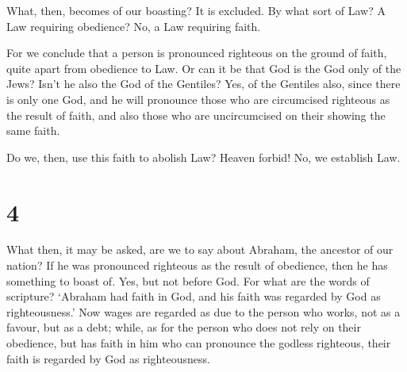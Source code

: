  What, then, becomes of our boasting? It is excluded. By
what sort of Law? A Law requiring obedience? No, a Law requiring faith.

 For we conclude that a person is pronounced righteous on
the ground of faith, quite apart from obedience to Law.  Or
can it be that God is the God only of the Jews? Isn't he also the God of
the Gentiles?  Yes, of the Gentiles also, since there is
only one God, and he will pronounce those who are circumcised righteous
as the result of faith, and also those who are uncircumcised on their
showing the same faith.

 Do we, then, use this faith to abolish Law? Heaven forbid!
No, we establish Law.

\hypertarget{section-3}{%
\section{4}\label{section-3}}

 What then, it may be asked, are we to say about Abraham,
the ancestor of our nation?  If he was pronounced righteous
as the result of obedience, then he has something to boast of. Yes, but
not before God.  For what are the words of scripture?
`Abraham had faith in God, and his faith was regarded by God as
righteousness.'  Now wages are regarded as due to the person
who works, not as a favour, but as a debt;  while, as for
the person who does not rely on their obedience, but has faith in him
who can pronounce the godless righteous, their faith is regarded by God
as righteousness.

